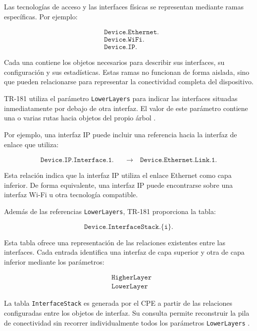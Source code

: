 Las tecnologías de acceso y las interfaces físicas se representan
mediante ramas específicas. Por ejemplo:

\[
\begin{aligned}
    &\texttt{Device.Ethernet.}\\
    &\texttt{Device.WiFi.}\\
    &\texttt{Device.IP.}
\end{aligned}
\]

Cada una contiene los objetos necesarios para describir sus interfaces,
su configuración y sus estadísticas. Estas ramas no funcionan de forma
aislada, sino que pueden relacionarse para representar la conectividad
completa del dispositivo.

TR-181 utiliza el parámetro \texttt{LowerLayers} para indicar las
interfaces situadas inmediatamente por debajo de otra interfaz. El valor
de este parámetro contiene una o varias rutas hacia objetos del propio
árbol \cite{bbf_tr181}.

Por ejemplo, una interfaz IP puede incluir una referencia hacia la
interfaz de enlace que utiliza:

\[
\begin{aligned}
    \texttt{Device.IP.Interface.1.}
    \quad &\longrightarrow \quad
    \texttt{Device.Ethernet.Link.1.}
\end{aligned}
\]

Esta relación indica que la interfaz IP utiliza el enlace Ethernet como
capa inferior. De forma equivalente, una interfaz IP puede encontrarse
sobre una interfaz Wi-Fi u otra tecnología compatible.

Además de las referencias \texttt{LowerLayers}, TR-181 proporciona la
tabla:

\[
    \texttt{Device.InterfaceStack.\{i\}.}
\]

Esta tabla ofrece una representación de las relaciones existentes entre
las interfaces. Cada entrada identifica una interfaz de capa superior y
otra de capa inferior mediante los parámetros:

\[
\begin{aligned}
    &\texttt{HigherLayer}\\
    &\texttt{LowerLayer}
\end{aligned}
\]

La tabla \texttt{InterfaceStack} es generada por el CPE a partir de las
relaciones configuradas entre los objetos de interfaz. Su consulta permite
reconstruir la pila de conectividad sin recorrer individualmente todos
los parámetros \texttt{LowerLayers} \cite{bbf_tr181}.

